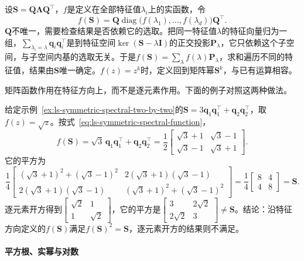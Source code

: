 设$\bm S=\bm Q\bm\Lambda\bm Q^\top$，$f$是定义在全部特征值$\lambda_i$上的实函数，令
\begin{equation}
 f(\bm S)=\bm Q\operatorname{diag}\bigl(f(\lambda_1),\ldots,f(\lambda_d)\bigr)\bm Q^\top.
 \label{eq:ls-symmetric-spectral-function}
\end{equation}
$\bm Q$不唯一，需要检查结果是否依赖它的选取。把同一特征值$\lambda$的特征向量归为一组，$\sum_{\lambda_i=\lambda}\bm q_i\bm q_i^\top$是到特征空间$\ker(\bm S-\lambda\bm I)$的正交投影$\bm P_\lambda$，它只依赖这个子空间，与子空间内基的选取无关。于是$f(\bm S)=\sum_\lambda f(\lambda)\bm P_\lambda$，求和遍历不同的特征值，结果由$\bm S$唯一确定。$f(z)=z^k$时，定义回到矩阵幂$\bm S^k$，与已有运算相容。

矩阵函数作用在特征方向上，而不是逐元素作用。下面的例子对照这两种做法。
\begin{example}[矩阵平方根与逐元素开方]
\label{ex:ls-matrix-square-root-two-by-two}
给定示例~\ref{ex:ls-symmetric-spectral-two-by-two}的$\bm S=3\bm q_1\bm q_1^\top+\bm q_2\bm q_2^\top$，取$f(z)=\sqrt z$。按式~\eqref{eq:ls-symmetric-spectral-function}，
\[
 f(\bm S)=\sqrt3\,\bm q_1\bm q_1^\top+\bm q_2\bm q_2^\top
 =\frac12\begin{bmatrix}\sqrt3+1&\sqrt3-1\\\sqrt3-1&\sqrt3+1\end{bmatrix}.
\]
它的平方为
\[
 \frac14\begin{bmatrix}(\sqrt3+1)^2+(\sqrt3-1)^2&2(\sqrt3+1)(\sqrt3-1)\\2(\sqrt3+1)(\sqrt3-1)&(\sqrt3+1)^2+(\sqrt3-1)^2\end{bmatrix}
 =\frac14\begin{bmatrix}8&4\\4&8\end{bmatrix}=\bm S .
\]
逐元素开方得到$\left[\begin{smallmatrix}\sqrt2&1\\1&\sqrt2\end{smallmatrix}\right]$，它的平方是$\left[\begin{smallmatrix}3&2\sqrt2\\2\sqrt2&3\end{smallmatrix}\right]\neq\bm S$。结论：沿特征方向定义的$f(\bm S)$满足$f(\bm S)^2=\bm S$，逐元素开方的结果则不满足。
\end{example}

\paragraph{平方根、实幂与对数}

